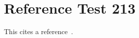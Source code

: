 \documentclass{article}
\begin{document}
\section{Reference Test 213}
This cites a reference~\cite{test213}.

\end{document}
